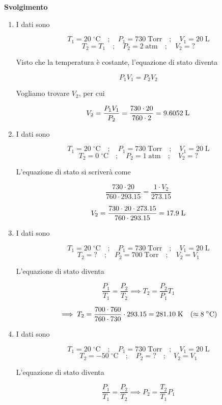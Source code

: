 \large\textbf{Svolgimento}\normalsize

\begin{enumerate}
    \item I dati sono

    $$T_1=20 \; ^{\circ}\text{C}
    \quad;\quad
    P_1=730 \; \text{Torr}
    \quad;\quad
    V_1=20 \; \text{L}$$
    $$T_2=T_1
    \quad;\quad
    P_2=2 \; \text{atm}
    \quad;\quad
    V_2=?$$
    
    Visto che la temperatura è costante, l'equazione di stato diventa
    
    $$P_1V_1=P_2V_2$$
    
    Vogliamo trovare $V_2$, per cui
    
    $$V_2=\frac{P_1V_1}{P_2}
    =\frac{730 \cdot 20}{760 \cdot 2}=9.6052 \; \rm L$$
    \item I dati sono

    $$T_1=20 \; ^{\circ}\text{C}
    \quad;\quad
    P_1=730 \; \text{Torr}
    \quad;\quad
    V_1=20 \; \text{L}$$
    $$T_2=0 \; ^{\circ}\text{C}
    \quad;\quad
    P_2=1 \; \text{atm}
    \quad;\quad
    V_2=?$$
    
    L'equazione di stato si scriverà come
    
    $$\frac{730 \cdot 20}{760 \cdot 293.15}=\frac{1 \cdot V_2}{273.15}$$
    
    $$V_2=\frac{730 \cdot 20 \cdot 273.15}{760 \cdot 293.15}=17.9 \; \rm L$$
    \item I dati sono

    $$T_1=20 \; ^{\circ}\text{C}
    \quad;\quad
    P_1=730 \; \text{Torr}
    \quad;\quad
    V_1=20 \; \text{L}$$
    $$T_2=?
    \quad;\quad
    P_2=700 \; \text{Torr}
    \quad;\quad
    V_2=V_1$$
    
    L'equazione di stato diventa
    
    $$\frac{P_1}{T_1}=\frac{P_2}{T_2}
    \implies
    T_2=\frac{P_2}{P_1}T_1$$
    
    $$\implies
    T_2=\frac{700 \cdot 760}{760 \cdot 730}\cdot 293.15
    =281.10 \; \rm K
    \quad(\approx 8 \; ^{\circ}C)$$
    \item I dati sono 

    $$T_1=20 \; ^{\circ}\text{C}
    \quad;\quad
    P_1=730 \; \text{Torr}
    \quad;\quad
    V_1=20 \; \text{L}$$
    $$T_2=-50 \; ^{\circ}\text{C}
    \quad;\quad
    P_2=?
    \quad;\quad
    V_2=V_1$$
    
    L'equazione di stato diventa
    
    $$\frac{P_1}{T_1}=\frac{P_2}{T_2}
    \implies
    P_2=\frac{T_2}{T_1}P_1$$
    

\end{enumerate}
